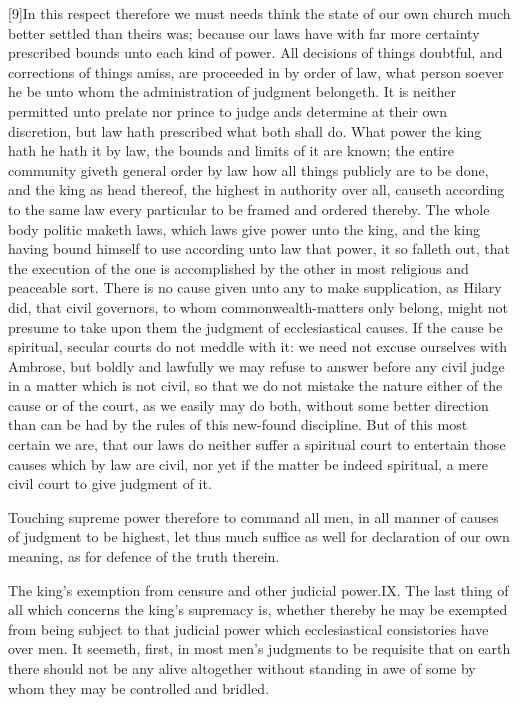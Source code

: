 [9]In this respect therefore we must needs think the state of our own church much better settled than theirs was; because our laws have with far more certainty prescribed bounds unto each kind of power. All decisions of things doubtful, and corrections of things amiss, are proceeded in by order of law, what person soever he be unto whom the administration of judgment belongeth. It is neither permitted unto prelate nor prince to judge ands determine at their own discretion, but law hath prescribed what both shall do. What power the king hath he hath it by law, the bounds and limits of it are known; the entire community giveth general order by law how all things publicly are to be done, and the king as head thereof, the highest in authority over all, causeth according to the same law every particular to be framed and ordered thereby. The whole body politic maketh laws, which laws give power unto the king, and the king having bound himself to use according unto law that power, it so falleth out, that the execution of the one is accomplished by the other in most religious and peaceable sort. There is no cause given unto any to make supplication, as Hilary did, that civil governors, to whom commonwealth-matters only belong, might not presume to take upon them the judgment of ecclesiastical causes. If the cause be spiritual, secular courts do not meddle with it: we need not excuse ourselves with Ambrose, but boldly and lawfully we may refuse to answer before any civil  judge in a matter which is not civil, so that we do not mistake the nature either of the cause or of the court, as we easily may do both, without some better direction than can be had by the rules of this new-found discipline. But of this most certain we are, that our laws do neither suffer a spiritual court to entertain those causes which by law are civil, nor yet if the matter be indeed spiritual, a mere civil court to give judgment of it.

Touching supreme power therefore to command all men, in all manner of causes of judgment to be highest, let thus much suffice as well for declaration of our own meaning, as for defence of the truth therein.

The king’s exemption from censure and other judicial power.IX. The last thing of all which concerns the king’s supremacy is, whether thereby he may be exempted from being subject to that judicial power which ecclesiastical consistories have over men. It seemeth, first, in most men’s judgments to be requisite that on earth there should not be any alive altogether without standing in awe of some by whom they may be controlled and bridled.

